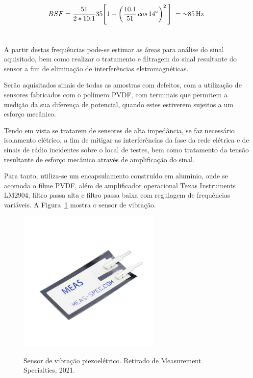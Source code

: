 \documentclass[
	12pt,				
	oneside,			
	a4paper,			
	english,			
	brazil,			
	]{abntex2ppgsi}
\begin{document}
\begin{equation}
	BSF = \frac{51}{2*10.1}35 \Bigg[  1 - \left ( \frac{10.1}{51} \,cos \, \ang{14} \right ) ^{2}  \Bigg] \ = \SI{~85}{{\hertz}} \
	\label{eq: BSF no rolamento}
\end{equation}


\section{}

A partir destas frequências pode-se estimar as áreas para análise do sinal aquisitado, bem como realizar o tratamento e filtragem do sinal resultante do sensor a fim de eliminação de interferências eletromagnéticas. 

Serão aquisitados sinais de todas as amostras com defeitos, com a utilização de sensores fabricados com o polímero PVDF, com terminais que permitem a medição da sua diferença de potencial, quando estes estiverem sujeitos a um esforço mecânico. 

Tendo em vista se tratarem de sensores de alta impedância, se faz necessário isolamento elétrico, a fim de mitigar as interferências da fase da rede elétrica e de sinais de rádio incidentes sobre o local de testes, bem como tratamento da tensão resultante de esforço mecânico através de amplificação do sinal. 

Para tanto, utiliza-se um encapsulamento construído em alumínio, onde se acomoda o filme PVDF, além de amplificador operacional Texas Instruments LM2904, filtro passa alta e filtro passa baixa com regulagem de frequências variáveis. A Figura~\ref{Figura21} mostra o sensor de vibração. 

\begin{figure}[H]
\centering
\caption {Sensor de vibração piezoelétrico. Retirado de Measurement Specialties, 2021.}
\includegraphics[width=\textwidth,height=70mm,keepaspectratio]{Figura21}
\label{Figura21}
\end{figure} 
\end{document}
